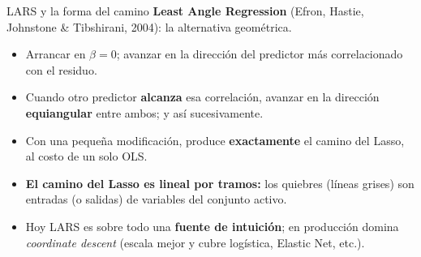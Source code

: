\documentclass{beamer}
\newcommand{\1}{\mathbb{I}}
\begin{document}
\begin{frame}{LARS y la forma del camino}
\small
\textbf{Least Angle Regression} (Efron, Hastie, Johnstone \& Tibshirani, 2004): la alternativa geométrica.
\begin{itemize}\itemsep4pt
  \item Arrancar en $\beta = 0$; avanzar en la dirección del predictor más correlacionado con el residuo.
  \item Cuando otro predictor \textbf{alcanza} esa correlación, avanzar en la dirección \textbf{equiangular} entre ambos; y así sucesivamente.
  \item Con una pequeña modificación, produce \textbf{exactamente} el camino del Lasso, al costo de un solo OLS. \pause
\end{itemize}

\vspace{0.1cm}
\begin{center}
\end{center}
\pause

\begin{itemize}\itemsep3pt
  \item \textbf{El camino del Lasso es lineal por tramos:} los quiebres (líneas grises) son entradas (o salidas) de variables del conjunto activo.
  \item Hoy LARS es sobre todo una \textbf{fuente de intuición}; en producción domina \emph{coordinate descent} (escala mejor y cubre logística, Elastic Net, etc.).
\end{itemize}
\end{frame}


\end{document}

